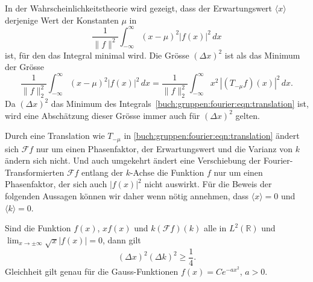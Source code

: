 In der Wahrscheinlichkeitstheorie wird gezeigt, dass der Erwartungswert
$\langle x\rangle$ derjenige Wert der Konstanten $\mu$ in
\begin{equation*}
\frac{1}{\|f\|^2}
\int_{-\infty}^\infty
(x-\mu)^2 
|f(x)|^2
\,dx
\end{equation*}
ist, für den das Integral minimal wird.
Die Grösse $(\Delta x)^2$ ist als das Minimum der Grösse
\begin{equation}
\frac{1}{\|f\|_2^2}
\int_{-\infty}^\infty
(x-\mu)^2 
|f(x)|^2
\,dx
=
\frac{1}{\|f\|_2^2}
\int_{-\infty}^\infty
x^2\, |(T_{-\mu}f)(x)|^2
\,dx.
\label{buch:gruppen:fourier:eqn:translation}
\end{equation}
Da $(\Delta x)^2$ das Minimum des
Integrals~\eqref{buch:gruppen:fourier:eqn:translation} ist, wird
eine Abschätzung dieser Grösse immer auch für $(\Delta x)^2$ gelten.

Durch eine Translation wie $T_{-\mu}$ in
\eqref{buch:gruppen:fourier:eqn:translation}
ändert sich $\mathscr{F}f$ nur um einen Phasenfaktor,
der Erwartungswert und die Varianz von $k$ ändern sich nicht.
Und auch umgekehrt ändert eine Verschiebung der Fourier-Transformierten
$\mathscr{F}f$ entlang der $k$-Achse die Funktion $f$ nur um einen
Phasenfaktor, der sich auch $|f(x)|^2$ nicht auswirkt. 
Für die Beweis der folgenden Aussagen können wir daher wenn nötig annehmen,
dass $\langle x\rangle=0$ und $\langle k\rangle = 0$.

\begin{satz}
\label{buch:gruppen:fourier:satz:heisenberg-pauli-weyl}
Sind die Funktion $f(x)$, $xf(x)$ und $k(\mathscr{F}f)(k)$ alle in
$L^2(\mathbb{R})$ und $\lim_{x\to\pm\infty} \sqrt{x}|f(x)|=0$, dann
gilt
\begin{equation}
(\Delta x)^2
(\Delta k)^2
\ge 
\frac14.
\label{buch:gruppen:fourier:eqn:heisenberg-pauli-weyl}
\end{equation}
Gleichheit gilt genau für die Gauss-Funktionen $f(x)=Ce^{-ax^2}$, $a>0$.
\end{satz}

